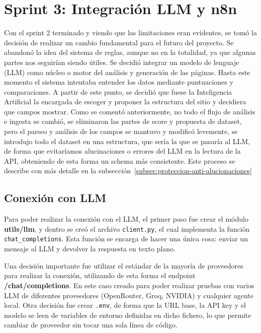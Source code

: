 \section{Sprint 3: Integración LLM y n8n}
\label{sec:integracion-llm-n8n}

Con el sprint 2 terminado y viendo que las limitaciones eran evidentes, se tomó la decisión de realizar un cambio fundamental para el futuro del proyecto. Se abandonó 
la idea del sistema de reglas, aunque no en la totalidad, ya que algunas partes nos seguirían siendo útiles. Se decidió integrar un
modelo de lenguaje (LLM) como núcleo o motor del análisis y generación de las páginas. Hasta este momento el sistema intentaba entender los datos mediante
puntuaciones y comparaciones. A partir de este punto, se decidió que fuese la Inteligencia Artificial la encargada de escoger y proponer la estructura del sitio y decidiera que 
campos mostrar. Como se comentó anteriormente, no todo el flujo de análisis e ingesta se cambió, se eliminaron las partes de score y propuesta de dataset, pero el parseo 
y análisis de los campos se mantuvo y modificó levemente, se introdujo todo el dataset en una estructura, que sería la que se pasaría al LLM, de forma que evitaríamos
alucinaciones o errores del LLM en la lectura de la API, obteniendo de esta forma un schema más consistente. Este proceso se describe con más detalle en la subsección~\ref{subsec:proteccion-anti-alucionaciones}


\subsection{Conexión con LLM}
\label{subsec:conexion-llm}

Para poder realizar la conexión con el LLM, el primer paso fue crear el módulo \textbf{utils/llm}, y dentro se creó el archivo \texttt{client.py}, el cual
implementa la función \texttt{chat\_completions}. Esta función se encarga de hacer una única cosa: enviar un mensaje al LLM y devolver la respuesta en texto
plano.

Una decisión importante fue utilizar el estándar de la mayoría de proveedores para realizar la conexión, utilizando de esta forma el endpoint \textbf{/chat/completions}. En este caso creado para poder realizar pruebas con varios LLM de diferentes proveedores (OpenRouter, Groq, NVIDIA) y cualquier agente local.
Otra decisión fue crear \texttt{.env}, de forma que la URL base, la API key y el modelo se leen de variables de entorno definidas en dicho fichero, lo que permite cambiar de proveedor sin tocar una sola línea de código.

